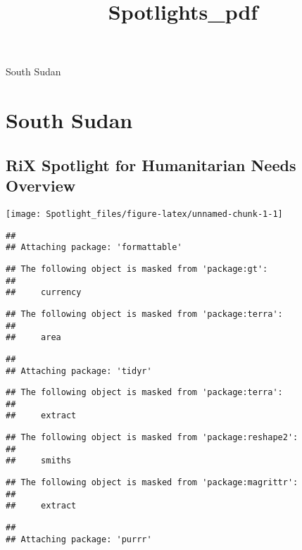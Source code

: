 \documentclass[
]{article}
\title{Spotlights\_pdf}
\author{}
\date{\vspace{-2.5em}}
\begin{document}
\maketitle

South Sudan

\hypertarget{south-sudan}{%
\section{South Sudan}\label{south-sudan}}

\hypertarget{rix-spotlight-for-humanitarian-needs-overview}{%
\subsection{RiX Spotlight for Humanitarian Needs
Overview}\label{rix-spotlight-for-humanitarian-needs-overview}}

\texttt{[image: Spotlight\_files/figure-latex/unnamed-chunk-1-1]}

\begin{verbatim}
## 
## Attaching package: 'formattable'
\end{verbatim}

\begin{verbatim}
## The following object is masked from 'package:gt':
## 
##     currency
\end{verbatim}

\begin{verbatim}
## The following object is masked from 'package:terra':
## 
##     area
\end{verbatim}

\begin{verbatim}
## 
## Attaching package: 'tidyr'
\end{verbatim}

\begin{verbatim}
## The following object is masked from 'package:terra':
## 
##     extract
\end{verbatim}

\begin{verbatim}
## The following object is masked from 'package:reshape2':
## 
##     smiths
\end{verbatim}

\begin{verbatim}
## The following object is masked from 'package:magrittr':
## 
##     extract
\end{verbatim}

\begin{verbatim}
## 
## Attaching package: 'purrr'
\end{verbatim}
\end{document}
